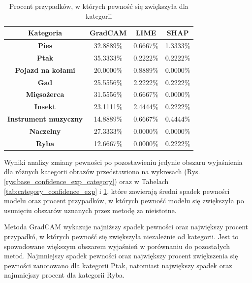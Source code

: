 \begin{table}[h]
	\centering
	\begin{tabular}{|c|c|c|c|}
		\hline
		\textbf{Kategoria}           & \textbf{GradCAM} & \textbf{LIME} & \textbf{SHAP} \\
		\hline
		\textbf{Pies}                & 32.8889\%        & 0.6667\%      & 1.3333\%      \\
		\hline
		\textbf{Ptak}                & 35.3333\%        & 0.2222\%      & 0.2222\%      \\
		\hline
		\textbf{Pojazd na kołami}    & 20.0000\%        & 0.8889\%      & 0.0000\%      \\
		\hline
		\textbf{Gad}                 & 25.5556\%        & 2.2222\%      & 0.2222\%      \\
		\hline
		\textbf{Mięsożerca}          & 31.5556\%        & 0.6667\%      & 0.0000\%      \\
		\hline
		\textbf{Insekt}              & 23.1111\%        & 2.4444\%      & 0.2222\%      \\
		\hline
		\textbf{Instrument muzyczny} & 14.8889\%        & 0.6667\%      & 0.4444\%      \\
		\hline
		\textbf{Naczelny}            & 27.3333\%        & 0.0000\%      & 0.0000\%      \\
		\hline
		\textbf{Ryba}                & 12.6667\%        & 0.0000\%      & 0.2222\%      \\
		\hline
	\end{tabular}
	\caption{Procent przypadków, w których pewność się zwiększyła dla kategorii}
	\label{tab:category_confidence_exp_percent}
\end{table}

Wyniki analizy zmiany pewności po pozostawieniu jedynie obszaru wyjaśnienia dla różnych kategorii obrazów przedstawiono na wykresach (Rys. \ref{rys:base_confidence_exp_category}) oraz w Tabelach \ref{tab:category_confidence_exp} i \ref{tab:category_confidence_exp_percent}, które zawierają średni spadek pewności modelu oraz procent przypadków, w których pewność modelu się zwiększyła po usunięciu obszarów uznanych przez metodę za nieistotne.

Metoda GradCAM wykazuje najniższy spadek pewności oraz największy procent przypadkó, w których pewność się zwiększyła niezależnie od kategorii.
Jest to spowodowane większym obszarem wyjaśnień w porównaniu do pozostałych metod.
Najmniejszy spadek pewności oraz największy procent zwiększenia się pewności zanotowano dla kategorii Ptak, natomiast największy spadek oraz najmniejszy procent dla kategorii Ryba.

